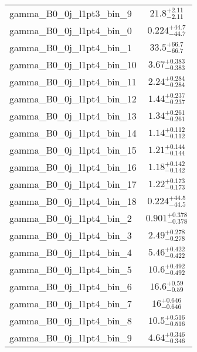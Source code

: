 \begin{tabular}{|l|c|}
gamma\_B0\_0j\_l1pt3\_bin\_9 & $21.8^{+2.11}_{-2.11}$ \\
gamma\_B0\_0j\_l1pt4\_bin\_0 & $0.224^{+44.7}_{-44.7}$ \\
gamma\_B0\_0j\_l1pt4\_bin\_1 & $33.5^{+66.7}_{-66.7}$ \\
gamma\_B0\_0j\_l1pt4\_bin\_10 & $3.67^{+0.383}_{-0.383}$ \\
gamma\_B0\_0j\_l1pt4\_bin\_11 & $2.24^{+0.284}_{-0.284}$ \\
gamma\_B0\_0j\_l1pt4\_bin\_12 & $1.44^{+0.237}_{-0.237}$ \\
gamma\_B0\_0j\_l1pt4\_bin\_13 & $1.34^{+0.261}_{-0.261}$ \\
gamma\_B0\_0j\_l1pt4\_bin\_14 & $1.14^{+0.112}_{-0.112}$ \\
gamma\_B0\_0j\_l1pt4\_bin\_15 & $1.21^{+0.144}_{-0.144}$ \\
gamma\_B0\_0j\_l1pt4\_bin\_16 & $1.18^{+0.142}_{-0.142}$ \\
gamma\_B0\_0j\_l1pt4\_bin\_17 & $1.22^{+0.173}_{-0.173}$ \\
gamma\_B0\_0j\_l1pt4\_bin\_18 & $0.224^{+44.5}_{-44.5}$ \\
gamma\_B0\_0j\_l1pt4\_bin\_2 & $0.901^{+0.378}_{-0.378}$ \\
gamma\_B0\_0j\_l1pt4\_bin\_3 & $2.49^{+0.278}_{-0.278}$ \\
gamma\_B0\_0j\_l1pt4\_bin\_4 & $5.46^{+0.422}_{-0.422}$ \\
gamma\_B0\_0j\_l1pt4\_bin\_5 & $10.6^{+0.492}_{-0.492}$ \\
gamma\_B0\_0j\_l1pt4\_bin\_6 & $16.6^{+0.59}_{-0.59}$ \\
gamma\_B0\_0j\_l1pt4\_bin\_7 & $16^{+0.646}_{-0.646}$ \\
gamma\_B0\_0j\_l1pt4\_bin\_8 & $10.5^{+0.516}_{-0.516}$ \\
gamma\_B0\_0j\_l1pt4\_bin\_9 & $4.64^{+0.346}_{-0.346}$ \\
\hline
\end{tabular}
